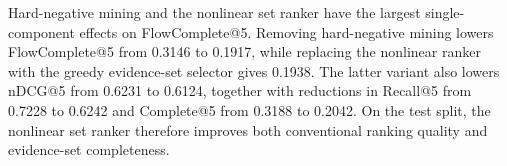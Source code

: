 Hard-negative mining and the nonlinear set ranker have the largest single-component effects on FlowComplete@5. Removing hard-negative mining lowers FlowComplete@5 from 0.3146 to 0.1917, while replacing the nonlinear ranker with the greedy evidence-set selector gives 0.1938. The latter variant also lowers nDCG@5 from 0.6231 to 0.6124, together with reductions in Recall@5 from 0.7228 to 0.6242 and Complete@5 from 0.3188 to 0.2042. On the test split, the nonlinear set ranker therefore improves both conventional ranking quality and evidence-set completeness.

